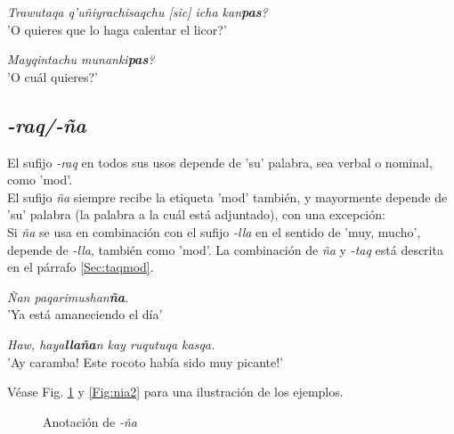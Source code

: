 \documentclass[a4paper,11pt,DIV12]{scrartcl}
\begin{document}
\begin{examples}
 \item {\em Trawutaqa q'u\~niyrachisaqchu [sic] icha kan\textbf{pas}?}\\
      '{\textquestiondown}O quieres que lo haga calentar el licor?'
  \item {\em Mayqintachu munanki\textbf{pas}?}\\
	'{\textquestiondown}O cu\'al quieres?'\\
    		\hfill{\small \citep[239]{Cusi2}}
\end{examples}



  \subsection{{\em-raq/-\~na}}
El sufijo {\em -raq} en todos sus usos depende de 'su' palabra, sea verbal o nominal, como 'mod'.\\
El sufijo {\em \~na} siempre recibe la etiqueta 'mod' tambi\'en, y mayormente depende de 'su' palabra (la palabra a la cu\'al est\'a adjuntado), con una excepci\'on:\\
Si {\em \~na} se usa en combinaci\'on con el sufijo {\em -lla} en el sentido de 'muy, mucho', depende de {\em -lla}, tambi\'en como 'mod'. La combinaci\'on de {\em \~na} y {\em -taq} est\'a descrita en el p\'arrafo \ref{Sec:taqmod}.

\begin{examples}
 \item {\em \~Nan paqarimushan\textbf{\~na}.}\\
	'Ya est\'a amaneciendo el d\'ia'
 \item {\em Haw, haya\textbf{lla\~na}n kay ruqutuqa kasqa.}\\
	'{\textexclamdown}Ay caramba! {\textexclamdown}Este rocoto hab\'ia sido muy picante!'
    		\hfill{\small \citep[246]{Cusi2}}
\end{examples}

V\'ease Fig. \ref{Fig:nia1} y \ref{Fig:nia2} para una ilustraci\'on de los ejemplos.

\begin{figure}
\begin{center}
 \caption{Anotaci\'on de {\em  -\~na}}\label{Fig:nia1}
\end{center}
\end{figure}
\end{document}
